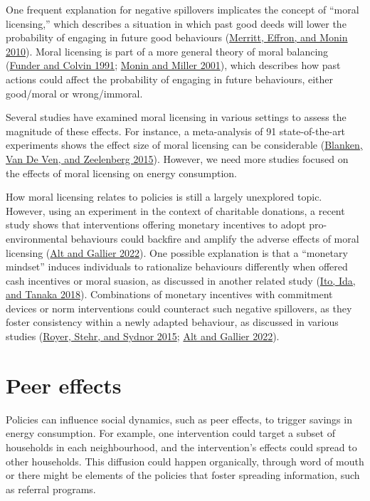 \documentclass[
  11pt,
  captions=heading]{scrreport}
\begin{document}
One frequent explanation for negative spillovers implicates the concept
of ``moral licensing,'' which describes a situation in which past good
deeds will lower the probability of engaging in future good behaviours
(\protect\hyperlink{ref-merritt2010moral}{Merritt, Effron, and Monin
2010}). Moral licensing is part of a more general theory of moral
balancing (\protect\hyperlink{ref-funder1991explorations}{Funder and
Colvin 1991}; \protect\hyperlink{ref-monin2001moral}{Monin and Miller
2001}), which describes how past actions could affect the probability of
engaging in future behaviours, either good/moral or wrong/immoral.

Several studies have examined moral licensing in various settings to
assess the magnitude of these effects. For instance, a meta-analysis of
91 state-of-the-art experiments shows the effect size of moral licensing
can be considerable (\protect\hyperlink{ref-blanken2015meta}{Blanken,
Van De Ven, and Zeelenberg 2015}). However, we need more studies focused
on the effects of moral licensing on energy consumption.

How moral licensing relates to policies is still a largely unexplored
topic. However, using an experiment in the context of charitable
donations, a recent study shows that interventions offering monetary
incentives to adopt pro-environmental behaviours could backfire and
amplify the adverse effects of moral licensing
(\protect\hyperlink{ref-alt2022incentives}{Alt and Gallier 2022}). One
possible explanation is that a ``monetary mindset'' induces individuals
to rationalize behaviours differently when offered cash incentives or
moral suasion, as discussed in another related study
(\protect\hyperlink{ref-ito2018moral}{Ito, Ida, and Tanaka 2018}).
Combinations of monetary incentives with commitment devices or norm
interventions could counteract such negative spillovers, as they foster
consistency within a newly adapted behaviour, as discussed in various
studies (\protect\hyperlink{ref-royer2015incentives}{Royer, Stehr, and
Sydnor 2015}; \protect\hyperlink{ref-alt2022incentives}{Alt and Gallier
2022}).

\hypertarget{peer-effects}{%
\section{Peer effects}\label{peer-effects}}

Policies can influence social dynamics, such as peer effects, to trigger
savings in energy consumption. For example, one intervention could
target a subset of households in each neighbourhood, and the
intervention's effects could spread to other households. This diffusion
could happen organically, through word of mouth or there might be
elements of the policies that foster spreading information, such as
referral programs.
\end{document}
